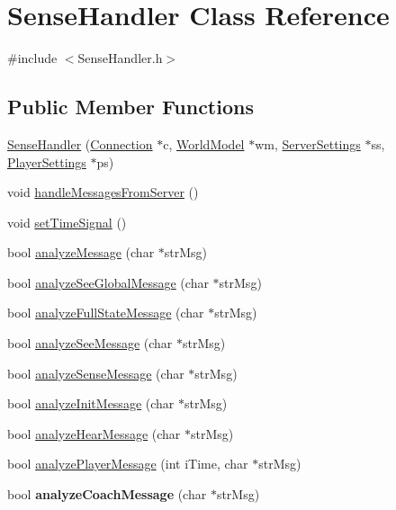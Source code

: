 \hypertarget{classSenseHandler}{}\section{Sense\+Handler Class Reference}
\label{classSenseHandler}


{\ttfamily \#include $<$Sense\+Handler.\+h$>$}

\subsection*{Public Member Functions}
\begin{DoxyCompactItemize}
\item 
\hyperlink{classSenseHandler_a46ac6a49527ffd3ec440e03ba4715932}{Sense\+Handler} (\hyperlink{classConnection}{Connection} $\ast$c, \hyperlink{classWorldModel}{World\+Model} $\ast$wm, \hyperlink{classServerSettings}{Server\+Settings} $\ast$ss, \hyperlink{classPlayerSettings}{Player\+Settings} $\ast$ps)
\item 
void \hyperlink{classSenseHandler_ac0f4abc8eba5206791c25ba9274ce084}{handle\+Messages\+From\+Server} ()
\item 
void \hyperlink{classSenseHandler_a7f65bfb50f5f6704c114aeb2e8d3b648}{set\+Time\+Signal} ()
\item 
bool \hyperlink{classSenseHandler_afad33b483d0a755ab48634564f01420c}{analyze\+Message} (char $\ast$str\+Msg)
\item 
bool \hyperlink{classSenseHandler_a96d729a840d166dcb2260e2cab2cb7c5}{analyze\+See\+Global\+Message} (char $\ast$str\+Msg)
\item 
bool \hyperlink{classSenseHandler_add8e9a1d9bb5f1241fe489d0c789f939}{analyze\+Full\+State\+Message} (char $\ast$str\+Msg)
\item 
bool \hyperlink{classSenseHandler_afad1ea18935a06b7e8a40d867356a453}{analyze\+See\+Message} (char $\ast$str\+Msg)
\item 
bool \hyperlink{classSenseHandler_abe1febd4a564b87f03451f0f2941123f}{analyze\+Sense\+Message} (char $\ast$str\+Msg)
\item 
bool \hyperlink{classSenseHandler_a678a0c6b79da9966de0bfe1b411c4954}{analyze\+Init\+Message} (char $\ast$str\+Msg)
\item 
bool \hyperlink{classSenseHandler_add082258f3701fc654c292beb287b564}{analyze\+Hear\+Message} (char $\ast$str\+Msg)
\item 
bool \hyperlink{classSenseHandler_a147ada35356dc3094c97c4299a88ef5b}{analyze\+Player\+Message} (int i\+Time, char $\ast$str\+Msg)
\item 
bool {\bfseries analyze\+Coach\+Message} (char $\ast$str\+Msg)\hypertarget{classSenseHandler_a31cbb00d960203a651e2b57967151bba}{}\label{classSenseHandler_a31cbb00d960203a651e2b57967151bba}


\end{DoxyCompactItemize}
